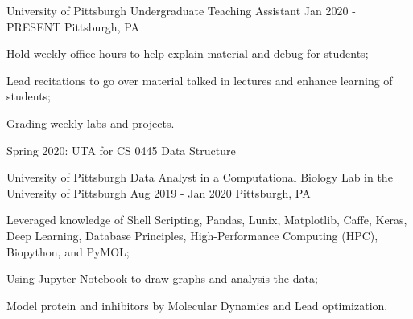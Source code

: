 
\begin{cventries}
  \cventry
    {University of Pittsburgh} %
    {Undergraduate Teaching Assistant} %
    {Jan 2020 - PRESENT} %
    {Pittsburgh, PA} %
    {
      \begin{cvitems} %
        \item {Hold weekly office hours to help explain material and debug for students;}
        \item {Lead recitations to go over material talked in lectures and enhance learning of students;}
        \item {Grading weekly labs and projects.}
        \item {Spring 2020: UTA for CS 0445 Data Structure}
      \end{cvitems}
    }


    \cventry
    {University of Pittsburgh} %
    {Data Analyst in a Computational Biology Lab in the University of Pittsburgh} %
    {Aug 2019 - Jan 2020} %
    {Pittsburgh, PA} %
    {
      \begin{cvitems} %
        \item {Leveraged knowledge of Shell Scripting, Pandas, Lunix, Matplotlib, Caffe, Keras, Deep Learning, Database Principles, High-Performance Computing (HPC), Biopython, and PyMOL;}
        \item {Using Jupyter Notebook to draw graphs and analysis the data;}
        \item {Model protein and inhibitors by Molecular Dynamics and Lead optimization.}
      \end{cvitems}
    }
    
    
\end{cventries}
